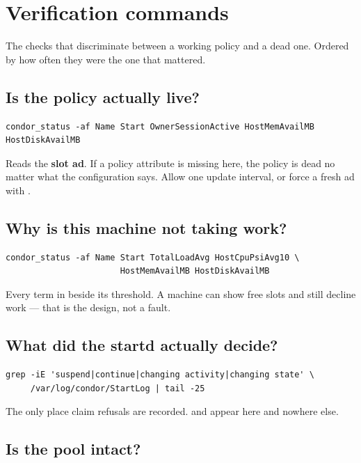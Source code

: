 \chapter{Verification commands}
\label{app:verify}

The checks that discriminate between a working policy and a dead one. Ordered by
how often they were the one that mattered.

\section{Is the policy actually live?}

\begin{lstlisting}[style=term]
condor_status -af Name Start OwnerSessionActive HostMemAvailMB HostDiskAvailMB
\end{lstlisting}

Reads the \textbf{slot ad}. If a policy attribute is missing here, the policy is
dead no matter what the configuration says. Allow one update interval, or force
a fresh ad with .

\section{Why is this machine not taking work?}

\begin{lstlisting}[style=term]
condor_status -af Name Start TotalLoadAvg HostCpuPsiAvg10 \
                       HostMemAvailMB HostDiskAvailMB
\end{lstlisting}

Every term in  beside its threshold. A machine can show free slots and
still decline work --- that is the design, not a fault.

\section{What did the startd actually decide?}

\begin{lstlisting}[style=term]
grep -iE 'suspend|continue|changing activity|changing state' \
     /var/log/condor/StartLog | tail -25
\end{lstlisting}

The only place claim refusals are recorded.  and  appear here and nowhere else.

\section{Is the pool intact?}

